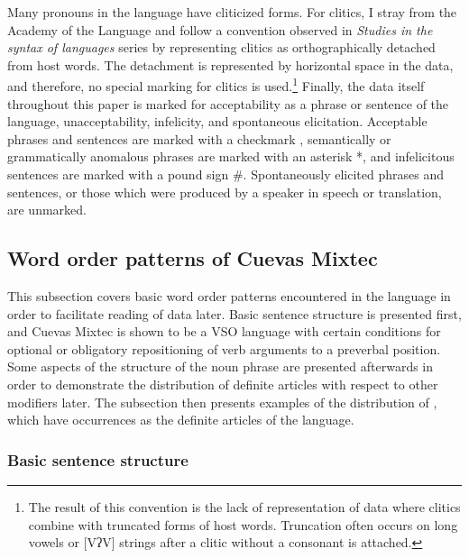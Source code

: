 \documentclass[output=paper,modfonts,nonflat]{langsci/langscibook}
\begin{document}
Many pronouns in the language have cliticized forms.  For clitics, I stray from the Academy of the  Language and follow a convention observed in\linebreak {} \textit{Studies in the syntax of  languages} series by representing clitics as orthographically detached from host words.  The detachment is represented by horizontal space in the data, and therefore, no special marking for clitics is used.\footnote{The result of this convention is the lack of representation of data where clitics combine with truncated forms of host words.  Truncation often occurs on long vowels or [VʔV] strings after a clitic without a consonant is attached.}  Finally, the data itself throughout this paper is marked for acceptability as a phrase or sentence of the language, unacceptability, infelicity, and spontaneous elicitation.  Acceptable phrases and sentences are marked with a checkmark \checkmark, semantically or grammatically anomalous phrases are marked with an asterisk *, and infelicitous sentences are marked with a pound sign \#.  Spontaneously elicited phrases and sentences, or those which were produced by a speaker in speech or translation, are unmarked.

\subsection{Word order patterns of Cuevas Mixtec} \label{sec:cisneros:3.3}

This subsection covers basic word order patterns encountered in the language in order to facilitate reading of  data later.  Basic sentence structure is presented first, and Cuevas Mixtec is shown to be a VSO language with certain conditions for optional or obligatory repositioning of verb arguments to a preverbal position.  Some aspects of the structure of the noun phrase are presented afterwards in order to demonstrate the distribution of definite articles with respect to other modifiers later.  The subsection then presents examples of the distribution of , which have occurrences as the definite articles of the language.

\subsubsection{Basic sentence structure} \label{sec:cisneros:3.3.1}
\end{document}
